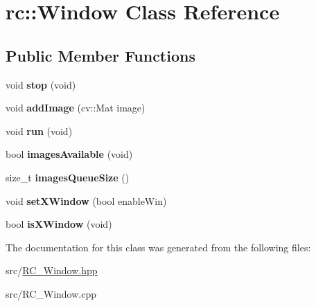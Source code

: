 \hypertarget{classrc_1_1Window}{\section{rc\+:\+:Window Class Reference}
\label{classrc_1_1Window}
}
\subsection*{Public Member Functions}
\begin{DoxyCompactItemize}
\item 
\hypertarget{classrc_1_1Window_a115530da5a987d8c241b0febc3cddc8f}{void {\bfseries stop} (void)}\label{classrc_1_1Window_a115530da5a987d8c241b0febc3cddc8f}

\item 
\hypertarget{classrc_1_1Window_a922ff36f569afe178403740df2e24604}{void {\bfseries add\+Image} (cv\+::\+Mat image)}\label{classrc_1_1Window_a922ff36f569afe178403740df2e24604}

\item 
\hypertarget{classrc_1_1Window_a15681842c7ce0ee6b9201cfa973d2ac1}{void {\bfseries run} (void)}\label{classrc_1_1Window_a15681842c7ce0ee6b9201cfa973d2ac1}

\item 
\hypertarget{classrc_1_1Window_a7cb65cbb3741a7711631f66c46c7b039}{bool {\bfseries images\+Available} (void)}\label{classrc_1_1Window_a7cb65cbb3741a7711631f66c46c7b039}

\item 
\hypertarget{classrc_1_1Window_a3c221423c38f30757d042b2621f22894}{size\+\_\+t {\bfseries images\+Queue\+Size} ()}\label{classrc_1_1Window_a3c221423c38f30757d042b2621f22894}

\item 
\hypertarget{classrc_1_1Window_a6acba37a50975d7315818d1a9722c7dc}{void {\bfseries set\+X\+Window} (bool enable\+Win)}\label{classrc_1_1Window_a6acba37a50975d7315818d1a9722c7dc}

\item 
\hypertarget{classrc_1_1Window_abd9877b14cf84b02e7c6ea54c23bc082}{bool {\bfseries is\+X\+Window} (void)}\label{classrc_1_1Window_abd9877b14cf84b02e7c6ea54c23bc082}

\end{DoxyCompactItemize}


The documentation for this class was generated from the following files\+:\begin{DoxyCompactItemize}
\item 
src/\hyperlink{RC__Window_8hpp}{R\+C\+\_\+\+Window.\+hpp}\item 
src/R\+C\+\_\+\+Window.\+cpp\end{DoxyCompactItemize}
